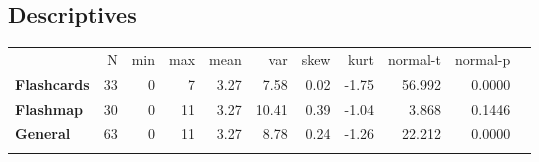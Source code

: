 \subsection{Descriptives}\label{descriptives}

\begin{longtable}[c]{@{}lrrrrrrrrrr@{}}
\toprule\addlinespace
& N & min & max & mean & var & skew & kurt & normal-t & normal-p
\\\addlinespace
\midrule\endhead
\textbf{Flashcards} & 33 & 0 & 7 & 3.27 & 7.58 & 0.02 & -1.75 & 56.992 &
0.0000
\\\addlinespace
\textbf{Flashmap} & 30 & 0 & 11 & 3.27 & 10.41 & 0.39 & -1.04 & 3.868 &
0.1446
\\\addlinespace
\textbf{General} & 63 & 0 & 11 & 3.27 & 8.78 & 0.24 & -1.26 & 22.212 &
0.0000
\\\addlinespace
\bottomrule
    \label{tab:dropouts}
\end{longtable}

